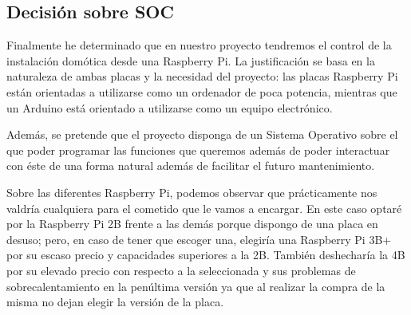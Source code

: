 \begin{landscape}
\begin{table}[]
\centering
{}
\caption{Comparativa Arduinos}
\label{tab:comp_Arduino}
\end{table}
\end{landscape}

\subsection{Decisión sobre SOC}\label{4.DecisionSOC}
Finalmente he determinado que en nuestro proyecto tendremos el control de la instalación domótica desde una Raspberry Pi\cite{misc:RbPWeb}. La justificación se basa en la naturaleza de ambas placas y la necesidad del proyecto: las placas Raspberry Pi están orientadas a utilizarse como un ordenador de poca potencia, mientras que un Arduino está orientado a utilizarse como un equipo electrónico.

Además, se pretende que el proyecto disponga de un Sistema Operativo sobre el que poder programar las funciones que queremos además de poder interactuar con éste de una forma natural además de facilitar el futuro mantenimiento.

Sobre las diferentes Raspberry Pi, podemos observar que prácticamente nos valdría cualquiera para el cometido que le vamos a encargar. En este caso optaré por la Raspberry Pi 2B frente a las demás porque dispongo de una placa en desuso; pero, en caso de tener que escoger una, elegiría una Raspberry Pi 3B+ por su escaso precio y capacidades superiores a la 2B. También deshecharía la 4B por su elevado precio con respecto a la seleccionada y sus problemas de sobrecalentamiento en la penúltima versión ya que al realizar la compra de la misma no dejan elegir la versión de la placa.

